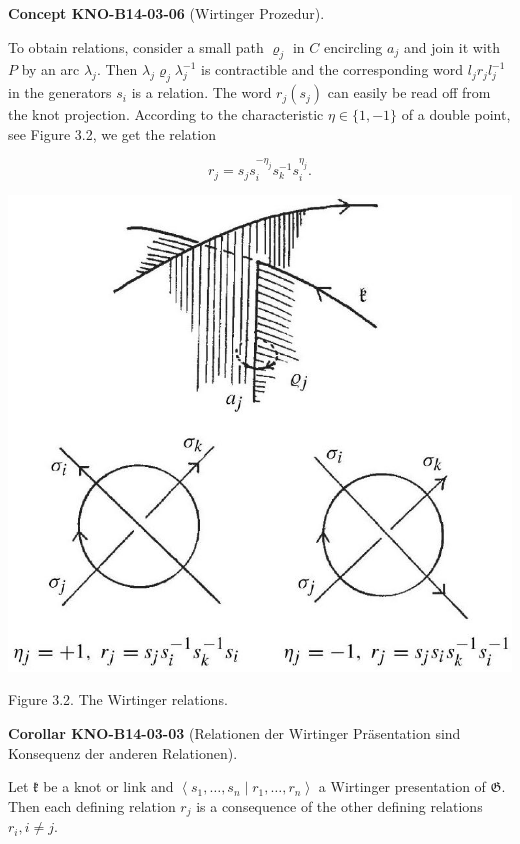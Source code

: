 \documentclass[10pt, letterpaper]{article}
\newcommand{\CustomHeading}[3]{%
  \par\medskip\noindent%
  \textbf{#1 #2} \textnormal{(#3)}.\enskip%
}
\newenvironment{KORO}[2]{\CustomHeading{Corollar}{#1}{#2}}{}
\newenvironment{CONC}[2]{\CustomHeading{Concept}{#1}{#2}}{}
\begin{document}
\begin{CONC}{KNO-B14-03-06}{Wirtinger Prozedur}
To obtain relations, consider a small path $\varrho_{j}$ in $C$ encircling $a_{j}$ and join it with $P$ by an arc $\lambda_{j}$. Then $\lambda_{j} \varrho_{j} \lambda_{j}^{-1}$ is contractible and the corresponding word $l_{j} r_{j} l_{j}^{-1}$ in the generators $s_{i}$ is a relation. The word $r_{j}\left(s_{j}\right)$ can easily be read off from the knot projection. According to the characteristic $\eta \in\{1,-1\}$ of a double point, see Figure 3.2, we get the relation

$$
r_{j}=s_{j} s_{i}^{-\eta_{j}} s_{k}^{-1} s_{i}^{\eta_{j}} .
$$

\includegraphics[scale=0.2,center]{2025_05_21_9c06be8de7a55410f8c1g-047}

Figure 3.2. The Wirtinger relations.
\end{CONC}

\begin{KORO}{KNO-B14-03-03}{Relationen der Wirtinger Präsentation sind Konsequenz der anderen Relationen}
Let $\mathfrak{k}$ be a knot or link and $\left\langle s_{1}, \ldots, s_{n} \mid r_{1}, \ldots, r_{n}\right\rangle$ a Wirtinger presentation of $\mathfrak{G}$. Then each defining relation $r_{j}$ is a consequence of the other defining relations $r_{i}, i \neq j$.
\end{KORO}
\end{document}

